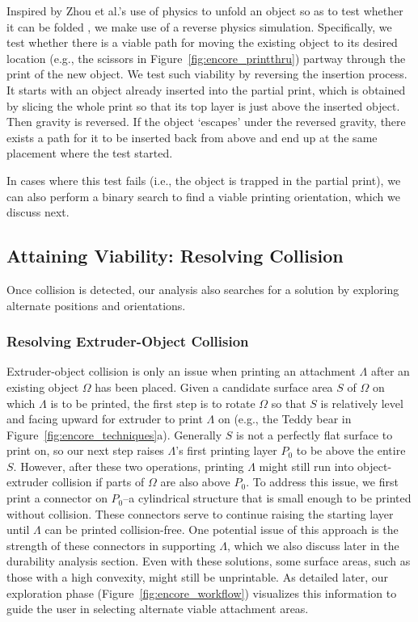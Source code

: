 Inspired by Zhou et al.'s use of physics to unfold an object so as to test whether it can be folded \cite{zhou2014boxelization}, we make use of a reverse physics simulation. Specifically, we test whether there is a viable path for moving the existing object to its desired location (e.g., the scissors in Figure~\ref{fig:encore_printthru}) partway through the print of the new object. We test such viability by reversing the insertion process. It starts with an object already inserted into the partial print, which is obtained by slicing the whole print so that its top layer is just above the inserted object. Then gravity is reversed. If the object `escapes' under the reversed gravity, there exists a path for it to be inserted back from above and end up at the same placement where the test started.

In cases where this test fails (i.e., the object is trapped in the partial print), we can also perform a binary search to find a viable printing orientation, which we discuss next.

\subsection{Attaining Viability: Resolving Collision}
Once collision is detected, our analysis also searches for a solution by exploring alternate positions and orientations.

\subsubsection{Resolving Extruder-Object Collision}
Extruder-object collision is only an issue when printing an attachment $\Lambda$ after an existing object $\Omega$ has been placed. Given a candidate surface area $S$ of $\Omega$ on which $\Lambda$ is to be printed, the first step is to rotate $\Omega$ so that $S$ is relatively level and facing upward for extruder to print $\Lambda$ on (e.g., the Teddy bear in Figure~\ref{fig:encore_techniques}a). Generally $S$ is not a perfectly flat surface to print on, so our next step raises $\Lambda$'s first printing layer $P_0$ to be above the entire $S$. However, after these two operations, printing $\Lambda$ might still run into object-extruder collision if parts of $\Omega$ are also above $P_0$. To address this issue, we first print a connector on $P_0$--a cylindrical structure that is small enough to be printed without collision. These connectors serve to continue raising the starting layer until $\Lambda$ can be printed collision-free. One potential issue of this approach is the strength of these connectors in supporting $\Lambda$, which we also discuss later in the durability analysis section.
Even with these solutions, some surface areas, such as those with a high convexity, might still be unprintable. As detailed later, our exploration phase (Figure~\ref{fig:encore_workflow}) visualizes this information to guide the user in selecting alternate viable attachment areas.

